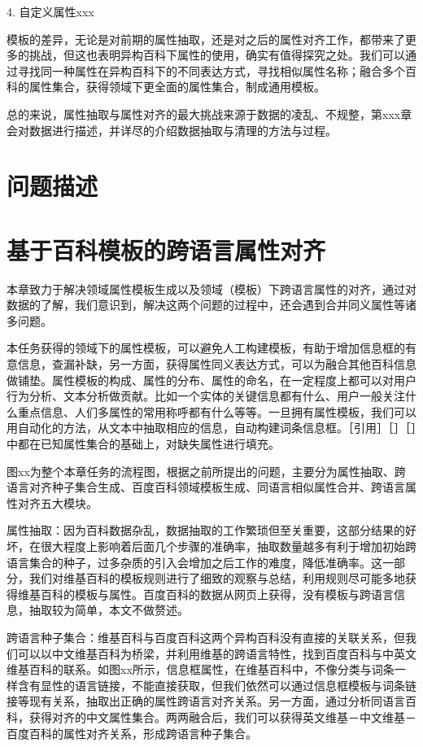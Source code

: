 4.  自定义属性xxx

模板的差异，无论是对前期的属性抽取，还是对之后的属性对齐工作，都带来了更多的挑战，但这也表明异构百科下属性的使用，确实有值得探究之处。我们可以通过寻找同一种属性在异构百科下的不同表达方式，寻找相似属性名称；融合多个百科的属性集合，获得领域下更全面的属性集合，制成通用模板。

总的来说，属性抽取与属性对齐的最大挑战来源于数据的凌乱、不规整，第xxx章会对数据进行描述，并详尽的介绍数据抽取与清理的方法与过程。

\section{问题描述}

\section{基于百科模板的跨语言属性对齐}

本章致力于解决领域属性模板生成以及领域（模板）下跨语言属性的对齐，通过对数据的了解，我们意识到，解决这两个问题的过程中，还会遇到合并同义属性等诸多问题。

本任务获得的领域下的属性模板，可以避免人工构建模板，有助于增加信息框的有意信息，查漏补缺，另一方面，获得属性同义表达方式，可以为融合其他百科信息做铺垫。属性模板的构成、属性的分布、属性的命名，在一定程度上都可以对用户行为分析、文本分析做贡献。比如一个实体的关键信息都有什么、用户一般关注什么重点信息、人们多属性的常用称呼都有什么等等。一旦拥有属性模板，我们可以用自动化的方法，从文本中抽取相应的信息，自动构建词条信息框。［引用］［］［］中都在已知属性集合的基础上，对缺失属性进行填充。

图xx为整个本章任务的流程图，根据之前所提出的问题，主要分为属性抽取、跨语言对齐种子集合生成、百度百科领域模板生成、同语言相似属性合并、跨语言属性对齐五大模块。

属性抽取：因为百科数据杂乱，数据抽取的工作繁琐但至关重要，这部分结果的好坏，在很大程度上影响着后面几个步骤的准确率，抽取数量越多有利于增加初始跨语言集合的种子，过多杂质的引入会增加之后工作的难度，降低准确率。这一部分，我们对维基百科的模板规则进行了细致的观察与总结，利用规则尽可能多地获得维基百科的模板与属性。百度百科的数据从网页上获得，没有模板与跨语言信息，抽取较为简单，本文不做赘述。

跨语言种子集合：维基百科与百度百科这两个异构百科没有直接的关联关系，但我们可以以中文维基百科为桥梁，并利用维基的跨语言特性，找到百度百科与中英文维基百科的联系。如图xx所示，信息框属性，在维基百科中，不像分类与词条一样含有显性的语言链接，不能直接获取，但我们依然可以通过信息框模板与词条链接等现有关系，抽取出正确的属性跨语言对齐关系。另一方面，通过分析同语言百科，获得对齐的中文属性集合。两两融合后，我们可以获得英文维基－中文维基－百度百科的属性对齐关系，形成跨语言种子集合。

